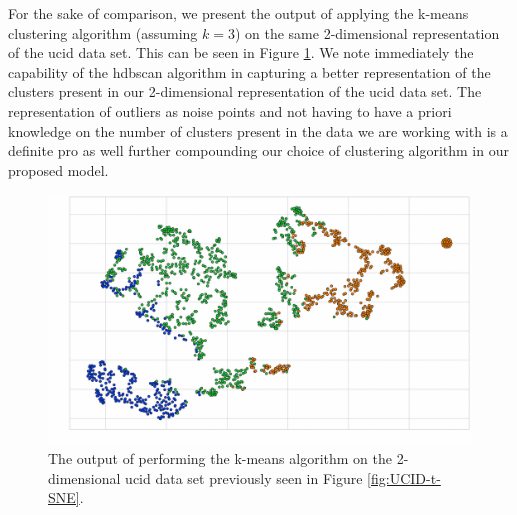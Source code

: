 \begin{adjustwidth}{-1.65cm}{-0.0cm}
\begin{enumerate}[label=Step 2.\arabic*:, leftmargin=*]
        \noindent \newline For the sake of comparison, we present the output of applying the k-means clustering algorithm (assuming $k = 3$) on the same 2-dimensional representation of the \gls{ucid} data set. This can be seen in Figure \ref{fig:UCID-K-Means}. We note immediately the capability of the \gls{hdbscan} algorithm in capturing a better representation of the clusters present in our 2-dimensional representation of the \gls{ucid} data set. The representation of outliers as noise points and not having to have a priori knowledge on the number of clusters present in the data we are working with is a definite pro as well further compounding our choice of clustering algorithm in our proposed model.
        
        \begin{figure}[H]
            \centering
            \includegraphics[width=\textwidth]{Images/Chapter 5/Stage 2/UCID/UCID-K-Means.pdf}
            \caption{The output of performing the k-means algorithm on the 2-dimensional \gls{ucid} data set previously seen in Figure \ref{fig:UCID-t-SNE}.}
            \label{fig:UCID-K-Means}
        \end{figure}
        

\end{enumerate}
\end{adjustwidth}
